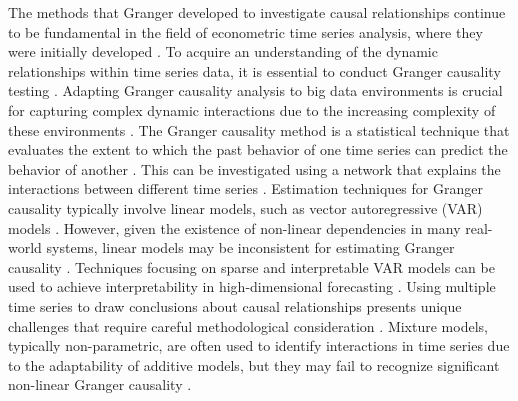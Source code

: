 \documentclass[11pt]{article}
\begin{document}
The methods that Granger developed to investigate causal relationships continue to be fundamental in the field of econometric time series analysis, where they were initially developed \cite{Granger1969Investigating}. To acquire an understanding of the dynamic relationships within time series data, it is essential to conduct Granger causality testing \cite{Granger1980Testing}. Adapting Granger causality analysis to big data environments is crucial for capturing complex dynamic interactions due to the increasing complexity of these environments \cite{Abderrahim2019better}. The Granger causality method is a statistical technique that evaluates the extent to which the past behavior of one time series can predict the behavior of another \cite{Ali2015Network}. This can be investigated using a network that explains the interactions between different time series \cite{Ali2015Network}. Estimation techniques for Granger causality typically involve linear models, such as vector autoregressive (VAR) models \cite{Ian2021Neural}. However, given the existence of non-linear dependencies in many real-world systems, linear models may be inconsistent for estimating Granger causality \cite{JianNaNGranger} \cite{Tong2011Nonlinear}. Techniques focusing on sparse and interpretable VAR models can be used to achieve interpretability in high-dimensional forecasting \cite{William2020High}. Using multiple time series to draw conclusions about causal relationships presents unique challenges that require careful methodological consideration \cite{ael2013Causal}. Mixture models, typically non-parametric, are often used to identify interactions in time series due to the adaptability of additive models\cite{HastieNaNGeneralized}, but they may fail to recognize significant non-linear Granger causality \cite{Ian2017interpretable}.
\end{document}
